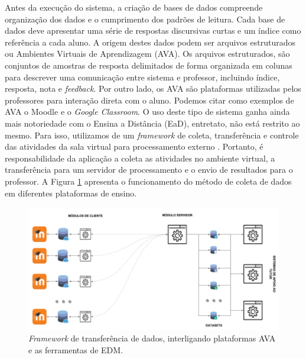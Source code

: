 Antes da execução do sistema, a criação de bases de dados compreende organização dos dados e o cumprimento dos padrões de leitura. Cada base de dados deve apresentar uma série de respostas discursivas curtas e um índice como referência a cada aluno. A origem destes dados podem ser arquivos estruturados ou Ambientes Virtuais de Aprendizagem (AVA). Os arquivos estruturados, são conjuntos de amostras de resposta delimitados de forma organizada em colunas para descrever uma comunicação entre sistema e professor, incluindo índice, resposta, nota e \textit{feedback}. Por outro lado, os AVA são plataformas utilizadas pelos professores para interação direta com o aluno. Podemos citar como exemplos de AVA o Moodle e o \textit{Google Classroom}. O uso deste tipo de sistema ganha ainda mais notoriedade com o Ensina a Distância (EaD), entretato, não está restrito ao mesmo. Para isso, utilizamos de um \textit{framework} de coleta, transferência e controle das atividades da sala virtual para processamento externo \cite{spalenza2018}. Portanto, é responsabilidade da aplicação a coleta as atividades no ambiente virtual, a transferência para um servidor de processamento e o envio de resultados para o professor. A Figura \ref{fig-framework} apresenta o funcionamento do método de coleta de dados em diferentes plataformas de ensino.

\begin{figure}[!h]
\centering
\includegraphics[width=\textwidth]{figuras/framework-moodle.png}
\caption{\textit{Framework} de transferência de dados, interligando plataformas AVA e as ferramentas de EDM.}
\label{fig-framework}
\end{figure}

